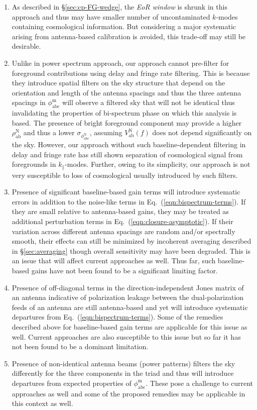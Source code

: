 \documentclass[
reprint,
superscriptaddress,
amsmath,
amssymb,
aps,
]{revtex4-1}
\begin{document}
\begin{enumerate}
\item As described in \S\ref{sec:cp-FG-wedge}, the {\it EoR window} is shrunk in this approach and thus may have smaller number of uncontaminated $k$-modes containing cosmological information. But considering a major systematic arising from antenna-based calibration is avoided, this trade-off may still be desirable.
\item Unlike in power spectrum approach, our approach cannot pre-filter for foreground contributions using delay and fringe rate filtering. This is because they introduce spatial filters on the sky structure that depend on the orientation and length of the antenna spacings and thus the three antenna spacings in $\phi_\textrm{abc}^\textrm{m}$ will observe a filtered sky that will not be identical thus invalidating the properties of bi-spectrum phase on which this analysis is based. The presence of bright foreground component may provide a higher $\rho_\textrm{ab}^\textrm{N}$ and thus a lower $\sigma_{\phi_\textrm{abc}^\textrm{N}}$, assuming $V_\textrm{ab}^\textrm{N}(f)$ does not depend significantly on the sky. However, our approach without such baseline-dependent filtering in delay and fringe rate has still shown separation of cosmological signal from foregrounds in $k_\parallel$-modes. Further, owing to its simplicity, our approach is not very susceptible to loss of cosmological usually introduced by such filters.
\item Presence of significant baseline-based gain terms will introduce systematic errors in addition to the noise-like terms in Eq.~(\ref{eqn:bispectrum-terms}). If they are small relative to antenna-based gains, they may be treated as additional perturbation terms in Eq.~(\ref{eqn:closure-asymptotic}). If their variation across different antenna spacings are random and/or spectrally smooth, their effects can still be minimized by incoherent averaging described in \S\ref{sec:averaging} though overall sensitivity may have been degraded. This is an issue that will affect current approaches as well. Thus far, such baseline-based gains have not been found to be a significant limiting factor. 
\item Presence of off-diagonal terms in the direction-independent Jones matrix of an antenna indicative of polarization leakage between the dual-polarization feeds of an antenna are still antenna-based and yet will introduce systematic departures from Eq.~(\ref{eqn:bispectrum-terms}). Some of the remedies described above for baseline-based gain terms are applicable for this issue as well. Current approaches are also susceptible to this issue but so far it has not been found to be a dominant limitation.
\item Presence of non-identical antenna beams (power patterns) filters the sky differently for the three components in the triad and thus will introduce departures from expected properties of $\phi_\textrm{abc}^\textrm{m}$. These pose a challenge to current approaches as well and some of the proposed remedies may be applicable in this context as well. 
\end{enumerate}
\end{document}
